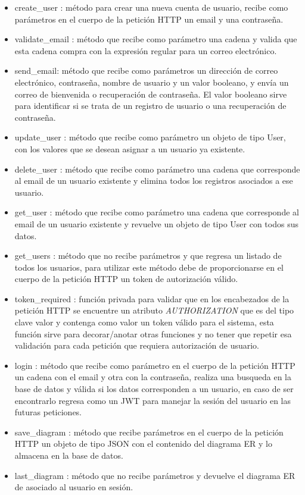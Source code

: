 \begin{itemize}
    \item create\_user : método para crear una nueva cuenta de usuario, recibe como parámetros en el cuerpo de la petición HTTP un email y una contraseña.
    \item validate\_email : método que recibe como parámetro una cadena y valida que esta cadena compra con la expresión regular para un correo electrónico.
    \item send\_email: método que recibe como parámetros un dirección de correo electrónico, contraseña, nombre de usuario y un valor booleano, y envía un correo de bienvenida o recuperación de contraseña. El valor booleano sirve para identificar si se trata de un registro de usuario o una recuperación de contraseña.
    \item update\_user : método que recibe como parámetro un objeto de tipo User, con los valores que se desean asignar a un usuario ya existente.
    \item delete\_user : método que recibe como parámetro una cadena que corresponde al email de un usuario existente y elimina todos los registros asociados a ese usuario.
    \item get\_user : método que recibe como parámetro  una cadena que corresponde al email de un usuario existente y revuelve un objeto de tipo User con todos sus datos.
    \item get\_users : método que no recibe parámetros y que regresa un listado de todos los usuarios, para utilizar este método debe de proporcionarse en el cuerpo de la petición HTTP un token de autorización válido.
    \item token\_required : función privada para validar que en los encabezados de la petición HTTP se encuentre un atributo \textit{AUTHORIZATION} que es del tipo clave valor y contenga como valor un token válido para el sistema, esta función sirve para decorar/anotar otras funciones y no tener que repetir esa validación para cada petición que requiera autorización de usuario.
    \item login : método que recibe como parámetro en el cuerpo de la petición HTTP un cadena con el email y otra con la contraseña, realiza una busqueda en la base de datos y válida si los datos corresponden a un usuario, en caso de ser encontrarlo regresa como un JWT para manejar la sesión del usuario en las futuras peticiones.
    \item save\_diagram : método que recibe parámetros en el cuerpo de la petición HTTP un objeto de tipo JSON con el contenido del diagrama ER y lo almacena en la base de datos.
    \item last\_diagram : método que no recibe parámetros y devuelve el diagrama ER de asociado al usuario en sesión.
\end{itemize}


